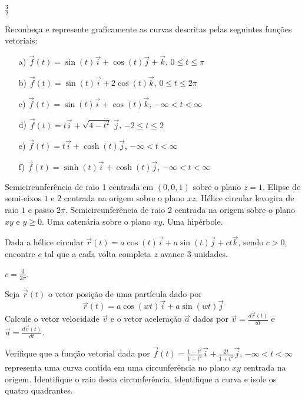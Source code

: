 \begin{resp}
 $\frac{3}{2}$
\end{resp}
\begin{exer} Reconheça e represente graficamente as curvas descritas pelas seguintes funções vetoriais:
\begin{itemize}
\item [a)] $\vec{f}(t)=\sin(t)\vec{i}+\cos(t)\vec{j}+\vec{k}$, $0\leq t \leq \pi$
\item [b)] $\vec{f}(t)=\sin(t)\vec{i}+2\cos(t)\vec{k}$, $0\leq t \leq 2\pi$
\item [c)] $\vec{f}(t)=\sin(t)\vec{i}+\cos(t)\vec{k}$, $-\infty < t < \infty$
\item [d)] $\vec{f}(t)=t\vec{i}+\sqrt{4-t^2}~\!\vec{j}$, $-2 \leq t \leq 2$
\item [e)] $\vec{f}(t)=t\vec{i}+\cosh(t)\vec{j}$, $-\infty < t < \infty $
\item [f)] $\vec{f}(t)=\sinh(t)\vec{i}+\cosh(t)\vec{j}$, $-\infty < t< \infty $
\end{itemize}
\end{exer}
\begin{resp} Semicircunferência de raio 1 centrada em $(0,0,1)$ sobre o plano $z=1$. Elipse de semi-eixos $1$ e $2$ centrada na origem sobre o plano $xz$. Hélice circular levogira de raio $1$ e passo $2\pi$.  Semicircunferência de raio 2 centrada na origem sobre o plano $xy$ e $y\geq 0$. Uma catenária sobre o plano $xy$. Uma hipérbole.
\end{resp}
\begin{exer}Dada a hélice circular $\vec{r}(t)=a\cos(t)\vec{i}+a\sin(t)\vec{j}+ct\vec{k}$, sendo $c>0$, encontre $c$ tal que a cada volta completa $z$ avance $3$ unidades.
 \end{exer}
 \begin{resp} $c=\frac{3}{2\pi}$.
 \end{resp}
\begin{exer}Seja $\vec{r}(t)$ o vetor posição de uma partícula dado por
$$\vec{r}(t)=a\cos(wt)\vec{i}+a\sin(wt)\vec{j}$$
Calcule o vetor velocidade $\vec{v}$ e o vetor aceleração $\vec{a}$ dados por $\vec{v}=\frac{d\vec{r}(t)}{dt}$ e $\vec{a}=\frac{d\vec{v}(t)}{dt}$.
\end{exer}



\begin{exer} Verifique que a função vetorial dada por $\vec{f}(t)=\frac{1-t^2}{1+t^2}\vec{i}+\frac{2t}{1+t^2}\vec{j}$, $-\infty<t<\infty$
representa uma curva contida em uma circunferência no plano $xy$  centrada na origem. Identifique o raio desta circunferência, identifique a curva e isole os quatro quadrantes.
\end{exer}

